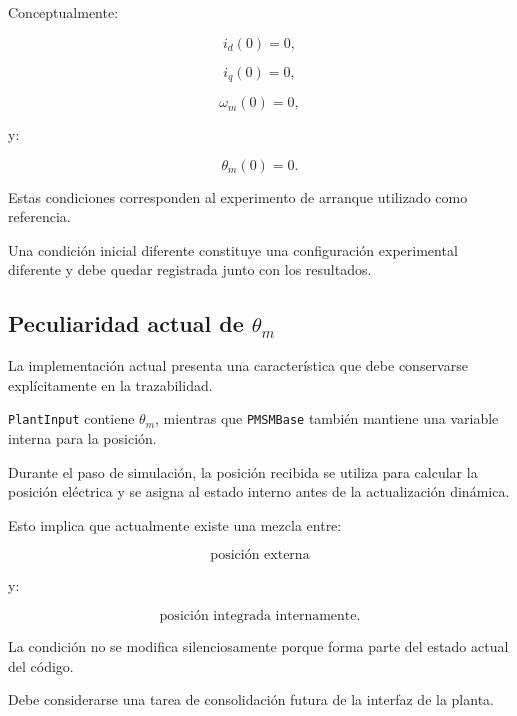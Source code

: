 Conceptualmente:

\begin{equation}
i_d(0)=0,
\end{equation}

\begin{equation}
i_q(0)=0,
\end{equation}

\begin{equation}
\omega_m(0)=0,
\end{equation}

y:

\begin{equation}
\theta_m(0)=0.
\end{equation}

Estas condiciones corresponden al experimento de arranque utilizado como referencia.

Una condición inicial diferente constituye una configuración experimental diferente y debe quedar registrada junto con los resultados.

\subsection{Peculiaridad actual de \texorpdfstring{$\theta_m$}{theta m}}

La implementación actual presenta una característica que debe conservarse explícitamente en la trazabilidad.

\texttt{PlantInput} contiene $\theta_m$, mientras que \texttt{PMSMBase} también mantiene una variable interna para la posición.

Durante el paso de simulación, la posición recibida se utiliza para calcular la posición eléctrica y se asigna al estado interno antes de la actualización dinámica.

Esto implica que actualmente existe una mezcla entre:

\begin{equation}
\text{posición externa}
\end{equation}

y:

\begin{equation}
\text{posición integrada internamente}.
\end{equation}

La condición no se modifica silenciosamente porque forma parte del estado actual del código.

Debe considerarse una tarea de consolidación futura de la interfaz de la planta.

